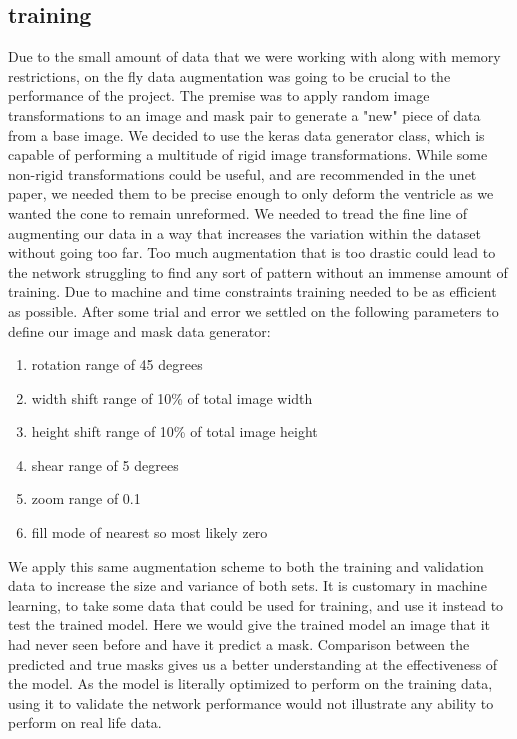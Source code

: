 \documentclass[12pt]{article}
\begin{document}
\subsection{training}
Due to the small amount of data that we were working with along with memory restrictions, on the fly data augmentation was going to be crucial to the performance of the project.
The premise was to apply random image transformations to an image and mask pair to generate a "new" piece of data from a base image.
We decided to use the keras data generator class, which is capable of performing a multitude of rigid image transformations. 
While some non-rigid transformations could be useful, and are recommended in the unet paper, we needed them to be precise enough to only deform the ventricle as we wanted the cone to remain unreformed.
We needed to tread the fine line of augmenting our data in a way that increases the variation within the dataset without going too far.
Too much augmentation that is too drastic could lead to the network struggling to find any sort of pattern without an immense amount of training.
Due to machine and time constraints training needed to be as efficient as possible.
After some trial and error we settled on the following parameters to define our image and mask data generator:

\begin{enumerate}
	\item{rotation range of 45 degrees}
	\item{width shift range of 10\% of total image width}
	\item{height shift range of 10\% of total image height}
	\item{shear range of 5 degrees}
	\item{zoom range of 0.1 }
	\item{fill mode of nearest so most likely zero}
\end{enumerate}

We apply this same augmentation scheme to both the training and validation data to increase the size and variance of both sets.
It is customary in machine learning, to take some data that could be used for training, and use it instead to test the trained model.
Here we would give the trained model an image that it had never seen before and have it predict a mask.
Comparison between the predicted and true masks gives us a better understanding at the effectiveness of the model.
As the model is literally optimized to perform on the training data, using it to validate the network performance would not illustrate any ability to perform on real life data.
\end{document}
